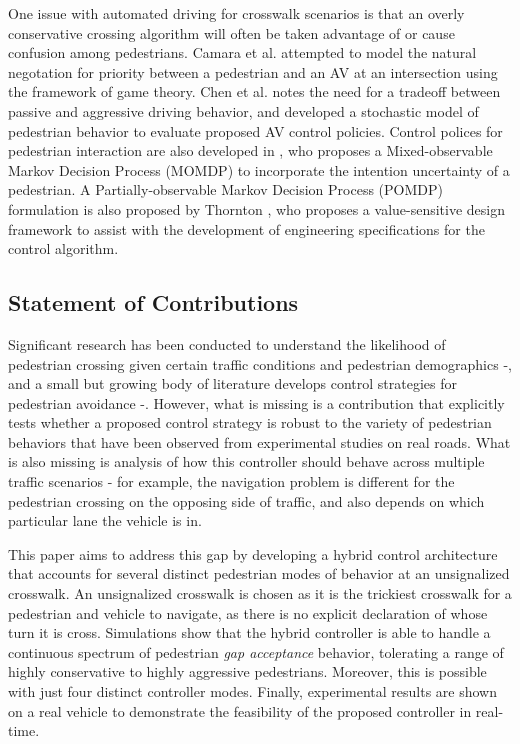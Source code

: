 \documentclass[letterpaper, 10 pt, conference]{ieeeconf}  %
\begin{document}
One issue with automated driving for crosswalk scenarios is that an overly conservative crossing algorithm will often be taken advantage of or cause confusion among pedestrians\cite{Camara2018}. Camara et al. \cite{Camara2018} attempted to model the natural negotation for priority between a pedestrian and an AV at an intersection using the framework of game theory. Chen et al. \cite{Chen} notes the need for a tradeoff between passive and aggressive driving behavior, and developed a stochastic model of pedestrian behavior to evaluate proposed AV control policies. Control polices for pedestrian interaction are also developed in \cite{Bandyopadhyay}, who proposes a Mixed-observable Markov Decision Process (MOMDP) to incorporate the intention uncertainty of a pedestrian. A Partially-observable Markov Decision Process (POMDP) formulation is also proposed by Thornton \cite{Thornton2018}, who proposes a value-sensitive design framework to assist with the development of engineering specifications for the control algorithm. 

\subsection{Statement of Contributions}
Significant research has been conducted to understand the likelihood of pedestrian crossing given certain traffic conditions and pedestrian demographics \cite{Schroeder2011} -\cite{Lee2005}, and a small but growing body of literature develops control strategies for pedestrian avoidance \cite{Bandyopadhyay}-\cite{Thornton2018}. However, what is missing is a contribution that explicitly  tests whether a proposed control strategy is robust to the variety of pedestrian behaviors that have been observed from experimental studies on real roads. What is also missing is analysis of how this controller should behave across multiple traffic scenarios - for example, the navigation problem is different for the pedestrian crossing on the opposing side of traffic, and also depends on which particular lane the vehicle is in.   

This paper aims to address this gap by developing a hybrid control architecture that accounts for several distinct pedestrian modes of behavior at an unsignalized crosswalk. An unsignalized crosswalk is chosen as it is the trickiest crosswalk for a pedestrian and vehicle to navigate, as there is no explicit declaration of whose turn it is cross. Simulations show that the hybrid controller is able to handle a continuous spectrum of pedestrian \textit{gap acceptance} behavior, tolerating a range of highly conservative to highly aggressive pedestrians. Moreover, this is possible with just four distinct controller modes. Finally, experimental results are shown on a real vehicle to demonstrate the feasibility of the proposed controller in real-time. 
\end{document}
